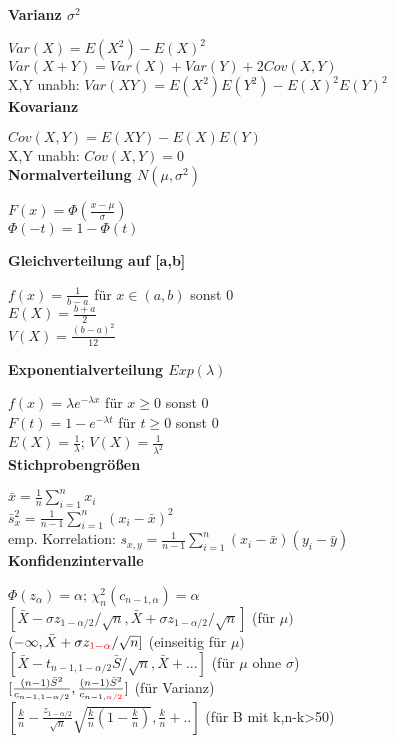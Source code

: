 \documentclass[10pt,twocolumn,a4paper]{article}
\begin{document}
\begin{flushleft}
\textbf{Varianz $\sigma^2$}

$Var(X) = E(X^2) - E(X)^2$\\
$Var(X+Y) = Var(X) + Var(Y) + 2 Cov(X,Y)$\\
X,Y unabh: $Var(XY) = E(X^2)E(Y^2) - E(X)^2E(Y)^2$\\

\textbf{Kovarianz}

$Cov(X, Y) = E(XY) - E(X)E(Y)$\\
X,Y unabh: $Cov(X,Y) = 0$\\

\textbf{Normalverteilung $N(\mu, \sigma^2)$}

$F(x) = \Phi(\frac{x-\mu}{\sigma})$\\
$\Phi(-t) = 1-\Phi(t)$

\textbf{Gleichverteilung auf [a,b]}

$f(x) = \frac{1}{b-a}$ für $x \in (a,b)$ sonst 0\\
$E(X) = \frac{b+a}{2}$\\
$V(X) = \frac{(b-a)^2}{12}$

\textbf{Exponentialverteilung $Exp(\lambda)$}

$f(x) = \lambda e^{-\lambda x}$ für $x \geq 0$ sonst 0\\
$F(t) = 1-e^{-\lambda t}$ für $t \geq 0$ sonst 0\\
$E(X) = \frac{1}{\lambda}$; $V(X) = \frac{1}{\lambda^2}$\\

\textbf{Stichprobengrößen}

$\bar{x} = \frac{1}{n} \sum_{i=1}^{n}x_i$\\
$\bar{s}_x^2 = \frac{1}{n-1} \sum_{i=1}^{n}(x_i-\bar{x})^2$\\
emp. Korrelation: $s_{x,y} = \frac{1}{n-1} \sum_{i=1}^{n}(x_i-\bar{x})(y_i-\bar{y})$\\

\textbf{Konfidenzintervalle}

$\Phi(z_{\alpha}) = \alpha$; $\chi^2_n(c_{n-1,\alpha})=\alpha$\\
$[\bar{X}-\sigma z_{1-\alpha/2}/\sqrt{n}, \bar{X}+\sigma z_{1-\alpha/2}/\sqrt{n}]$ (für $\mu)$\\
$(-\infty, \bar{X}+\sigma z_{\textcolor{red}{1-\alpha}}/\sqrt{n}]$ (einseitig für $\mu)$\\
$[\bar{X} - t_{n-1,1-\alpha/2}\bar{S}/\sqrt{n}, \bar{X} + ...]$ (für $\mu$ ohne $\sigma$)\\
$[\frac{(n-1)\bar{S}^2}{c_{n-1,1-\alpha/2}},\frac{(n-1)\bar{S}^2}{c_{n-1,\textcolor{red}{\alpha/2}}}]$ (für Varianz)\\
$[\frac{k}{n}-\frac{z_{1-\alpha/2}}{\sqrt{n}}\sqrt{\frac{k}{n}(1-\frac{k}{n})}, \frac{k}{n}+..]$ (für B mit k,n-k>50)\\


\end{flushleft}
\end{document}
